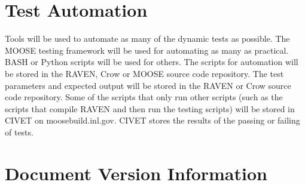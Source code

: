 \documentclass{article}
\begin{document}
\section{Test Automation}

Tools will be used to automate as many of the dynamic tests as
possible.  The MOOSE testing framework will be used for automating as
many as practical.  BASH or Python scripts will be used for others.
The scripts for automation will be stored in the RAVEN, Crow or MOOSE
source code repository.  The test parameters and expected output will
be stored in the RAVEN or Crow source code repository. Some of the
scripts that only run other scripts (such as the scripts that compile
RAVEN and then run the testing scripts) will be stored in CIVET on
moosebuild.inl.gov.  CIVET stores the results of the passing or
failing of tests.

\section*{Document Version Information}


\end{document}
